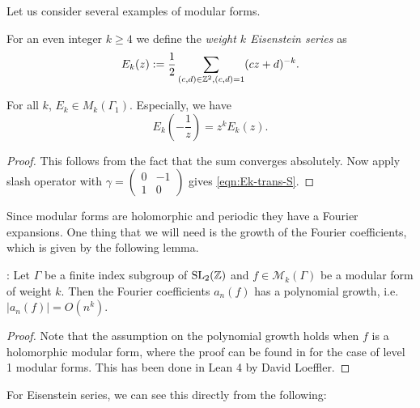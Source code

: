 Let us consider several examples of modular forms.
\begin{definition}\label{def:Ek}\leanok
For an even integer $k\geq 4$ we define the \emph{weight $k$ Eisenstein series} as
\begin{equation}\label{eqn:Ek-definition}
E_k(z):=\frac{1}{2}\sum_{(c,d)\in\mathbb{Z}^2, (c,d)=1}(cz+d)^{-k}.\end{equation}
\end{definition}
\begin{lemma}\label{lemma:Ek-is-modular-form}
For all $k$, $E_k\in M_k(\Gamma_1)$.
Especially, we have
\begin{equation}\label{eqn:Ek-trans-S}
    E_k \left(-\frac{1}{z}\right) = z^k E_k(z).
\end{equation}
\end{lemma}
\begin{proof}
    \leanok
This follows from the fact that the sum converges absolutely.
Now apply slash operator with $\gamma = \left(\begin{smallmatrix} 0 & -1 \\ 1 & 0 \end{smallmatrix}\right)$ gives \eqref{eqn:Ek-trans-S}.
\end{proof}

Since modular forms are holomorphic and periodic they have a Fourier expansions. One thing that we
will need is the growth of the Fourier coefficients, which is given by the following lemma.

\begin{lemma}\label{lemma:mod_form_poly_growth}\leanok : Let $\Gamma$ be a finite index subgroup of $\mathrm{SL}_2(\mathbb{Z})$ and $f \in \mathcal{M}_k(\Gamma)$ be a modular form of weight $k$. Then the Fourier coefficients $a_n(f)$ has a polynomial growth, i.e. $|a_n(f)| = O(n^k)$.
\end{lemma}

\begin{proof}\leanok
Note that the assumption on the polynomial growth holds when $f$ is a holomorphic modular form, where the proof can be found in \cite[p. 94]{Serre73} for the case of level 1 modular forms. This has been done in Lean 4 by David Loeffler.
\end{proof}

For Eisenstein series, we can see this directly from the following:

